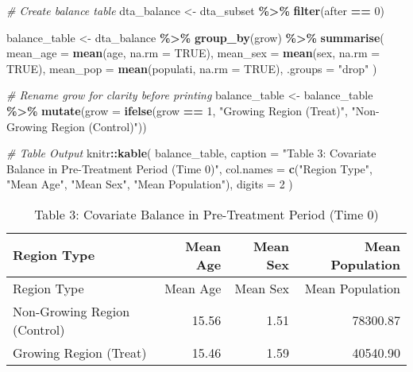 \documentclass[
]{article}
\newenvironment{Shaded}{\begin{snugshade}}{\end{snugshade}}
\newcommand{\AttributeTok}[1]{\textcolor[rgb]{0.13,0.29,0.53}{#1}}
\newcommand{\CommentTok}[1]{\textcolor[rgb]{0.56,0.35,0.01}{\textit{#1}}}
\newcommand{\ConstantTok}[1]{\textcolor[rgb]{0.56,0.35,0.01}{#1}}
\newcommand{\DecValTok}[1]{\textcolor[rgb]{0.00,0.00,0.81}{#1}}
\newcommand{\FunctionTok}[1]{\textcolor[rgb]{0.13,0.29,0.53}{\textbf{#1}}}
\newcommand{\NormalTok}[1]{#1}
\newcommand{\OtherTok}[1]{\textcolor[rgb]{0.56,0.35,0.01}{#1}}
\newcommand{\SpecialCharTok}[1]{\textcolor[rgb]{0.81,0.36,0.00}{\textbf{#1}}}
\newcommand{\StringTok}[1]{\textcolor[rgb]{0.31,0.60,0.02}{#1}}
\begin{document}
\begin{Shaded}
\begin{Highlighting}[]
\CommentTok{\# Create balance table}
\NormalTok{dta\_balance }\OtherTok{\textless{}{-}}\NormalTok{ dta\_subset }\SpecialCharTok{\%\textgreater{}\%}
  \FunctionTok{filter}\NormalTok{(after }\SpecialCharTok{==} \DecValTok{0}\NormalTok{)}

\NormalTok{balance\_table }\OtherTok{\textless{}{-}}\NormalTok{ dta\_balance }\SpecialCharTok{\%\textgreater{}\%}
  \FunctionTok{group\_by}\NormalTok{(grow) }\SpecialCharTok{\%\textgreater{}\%}
  \FunctionTok{summarise}\NormalTok{(}
    \AttributeTok{mean\_age =} \FunctionTok{mean}\NormalTok{(age, }\AttributeTok{na.rm =} \ConstantTok{TRUE}\NormalTok{),}
    \AttributeTok{mean\_sex =} \FunctionTok{mean}\NormalTok{(sex, }\AttributeTok{na.rm =} \ConstantTok{TRUE}\NormalTok{),}
    \AttributeTok{mean\_pop =} \FunctionTok{mean}\NormalTok{(populati, }\AttributeTok{na.rm =} \ConstantTok{TRUE}\NormalTok{),}
    \AttributeTok{.groups =} \StringTok{"drop"}
\NormalTok{  )}

\CommentTok{\# Rename \textquotesingle{}grow\textquotesingle{} for clarity before printing}
\NormalTok{balance\_table }\OtherTok{\textless{}{-}}\NormalTok{ balance\_table }\SpecialCharTok{\%\textgreater{}\%}
  \FunctionTok{mutate}\NormalTok{(}\AttributeTok{grow =} \FunctionTok{ifelse}\NormalTok{(grow }\SpecialCharTok{==} \DecValTok{1}\NormalTok{, }\StringTok{"Growing Region (Treat)"}\NormalTok{, }\StringTok{"Non{-}Growing Region (Control)"}\NormalTok{))}

\CommentTok{\# Table Output }
\NormalTok{knitr}\SpecialCharTok{::}\FunctionTok{kable}\NormalTok{(}
\NormalTok{  balance\_table,}
  \AttributeTok{caption =} \StringTok{"Table 3: Covariate Balance in Pre{-}Treatment Period (Time 0)"}\NormalTok{,}
  \AttributeTok{col.names =} \FunctionTok{c}\NormalTok{(}\StringTok{"Region Type"}\NormalTok{, }\StringTok{"Mean Age"}\NormalTok{, }\StringTok{"Mean Sex"}\NormalTok{, }\StringTok{"Mean Population"}\NormalTok{),}
  \AttributeTok{digits =} \DecValTok{2}
\NormalTok{)}
\end{Highlighting}
\end{Shaded}

\begin{longtable}[]{@{}lrrr@{}}
\caption{Table 3: Covariate Balance in Pre-Treatment Period (Time
0)}\tabularnewline
\toprule\noalign{}
Region Type & Mean Age & Mean Sex & Mean Population \\
\midrule\noalign{}
\endfirsthead
\toprule\noalign{}
Region Type & Mean Age & Mean Sex & Mean Population \\
\midrule\noalign{}
\endhead
\bottomrule\noalign{}
\endlastfoot
Non-Growing Region (Control) & 15.56 & 1.51 & 78300.87 \\
Growing Region (Treat) & 15.46 & 1.59 & 40540.90 \\
\end{longtable}
\end{document}
